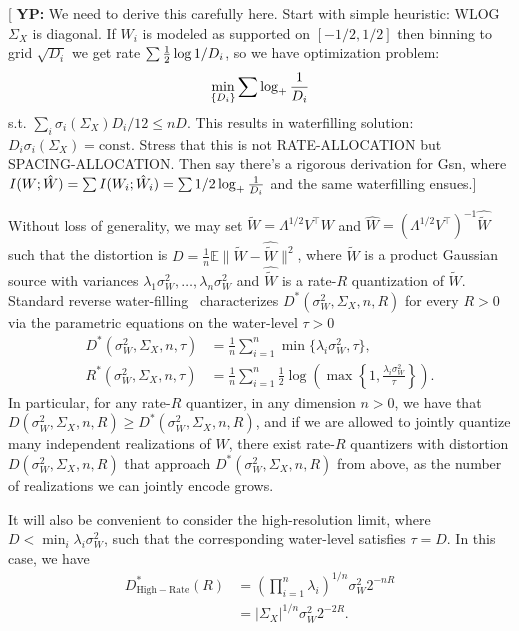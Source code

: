 \documentclass[journal]{IEEEtran}
\def\EE{\mathbb{E}}
\newcommand{\HR}{\mathrm{High-Rate}}
\newcommand{\nbyp}[1]{{\color{red}[ \textbf{YP:} #1}]}
\begin{document}
	\nbyp{We need to derive this carefully here. Start with simple heuristic: WLOG $\Sigma_X$ is
	diagonal. If $W_i$ is modeled as supported on $[-1/2,1/2]$ then binning to grid $\sqrt{D_i}$ we get rate
	$\sum {1\over 2}\log {1/D_i}$, so we have optimization problem:
	$$ \min_{\{D_i\}} \sum \log_+ {1\over D_i} $$
	s.t. $\sum_i \sigma_i(\Sigma_X) D_i/12 \le nD$. This results in waterfilling solution: $D_i
	\sigma_i(\Sigma_X) = \mathrm{const}$. Stress that this is not RATE-ALLOCATION but
	SPACING-ALLOCATION. Then say there's a rigorous derivation for Gsn, where $I(W;\hat W) = \sum I(W_i; \hat
	W_i) = \sum 1/2 \log_+ {1\over D_i}$ and the same waterfilling ensues.}

	Without loss of generality, we may set $\tilde{W}=\Lambda^{1/2}V^\top W$ and $\hat{W}=(\Lambda^{1/2}V^\top)^{-1}\hat{\tilde{W}}$ such that the distortion is $D=\frac{1}{n}\EE\|\tilde{W}-\hat{\tilde{W}}\|^2$, where $\tilde{W}$ is a product Gaussian source with variances $\lambda_1\sigma_W^2,\ldots,\lambda_n\sigma_W^2$ and $\hat{\tilde{W}}$ is a rate-$R$ quantization of $\tilde{W}$. Standard reverse water-filling~\cite[Chapter 10]{Cover} characterizes $D^*(\sigma_W^2,\Sigma_X,n,R)$ for every $R>0$ via the parametric equations on the water-level $\tau>0$
	\begin{align}
	D^*(\sigma_W^2,\Sigma_X,n,\tau)&=\frac{1}{n}\sum_{i=1}^n \min\{\lambda_i\sigma_W^2,\tau\},\nonumber\\
	R^*(\sigma_W^2,\Sigma_X,n,\tau)&=\frac{1}{n}\sum_{i=1}^n\frac{1}{2}\log\left(\max\left\{1,\frac{\lambda_i\sigma_W^2}{\tau}\right\} \right).
	\label{eq:waterfillingsolution}
	\end{align}
	In particular, for any rate-$R$ quantizer, in any dimension $n>0$, we have that $D(\sigma_W^2,\Sigma_X,n,R)\geq D^*(\sigma_W^2,\Sigma_X,n,R)$, and if we are allowed to jointly quantize many independent realizations of $W$, there exist rate-$R$ quantizers with distortion $D(\sigma_W^2,\Sigma_X,n,R)$ that approach $D^*(\sigma_W^2,\Sigma_X,n,R)$ from above, as the number of realizations we can jointly encode grows.

	It will also be convenient to consider the high-resolution limit, where $D<\min_{i}\lambda_i\sigma_W^2$, such that the corresponding water-level satisfies $\tau=D$. In this case, we have
	\begin{align}
	D_{\HR}^*(R)&=\left(\prod_{i=1}^n\lambda_i \right)^{1/n}\sigma_W^2 2^{-nR}\nonumber\\
	&=|\Sigma_X|^{1/n}\sigma_W^2 2^{-2R}.    
	\label{eq:Dhr}
	\end{align}
\end{document}
